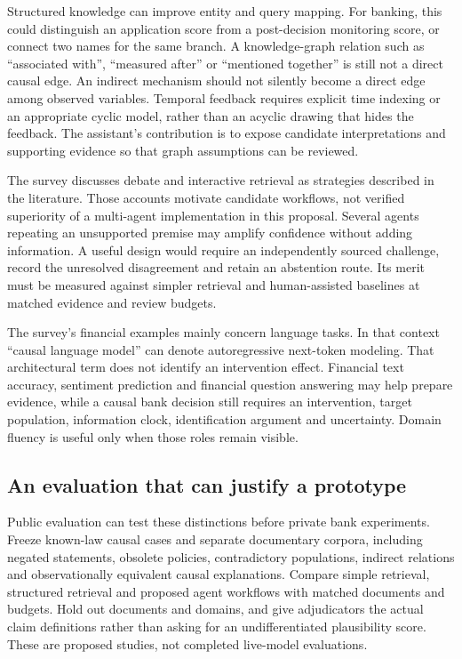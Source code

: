 Structured knowledge can improve entity and query mapping. For banking, this
could distinguish an application score from a post-decision monitoring score,
or connect two names for the same branch. A knowledge-graph relation such as
``associated with'', ``measured after'' or ``mentioned together'' is still not
a direct causal edge. An indirect mechanism should not silently become a
direct edge among observed variables. Temporal feedback requires explicit
time indexing or an appropriate cyclic model, rather than an acyclic drawing
that hides the feedback. The assistant's contribution is to expose candidate
interpretations and supporting evidence so that graph assumptions can be
reviewed.

The survey discusses debate and interactive retrieval as strategies described
in the literature. Those accounts motivate candidate workflows, not verified
superiority of a multi-agent implementation in this proposal. Several agents
repeating an unsupported premise may amplify confidence without adding
information. A useful design would require an independently sourced challenge,
record the unresolved disagreement and retain an abstention route. Its merit
must be measured against simpler retrieval and human-assisted baselines at
matched evidence and review budgets.

The survey's financial examples mainly concern language tasks. In that context
``causal language model'' can denote autoregressive next-token modeling.
That architectural term does not identify an intervention effect. Financial
text accuracy, sentiment prediction and financial question answering may help
prepare evidence, while a causal bank decision still requires an intervention,
target population, information clock, identification argument and uncertainty.
Domain fluency is useful only when those roles remain visible.

\subsection{An evaluation that can justify a prototype}

Public evaluation can test these distinctions before private bank experiments.
Freeze known-law causal cases and separate documentary corpora, including
negated statements, obsolete policies, contradictory populations, indirect
relations and observationally equivalent causal explanations. Compare simple
retrieval, structured retrieval and proposed agent workflows with matched
documents and budgets. Hold out documents and domains, and give adjudicators
the actual claim definitions rather than asking for an undifferentiated
plausibility score. These are proposed studies, not completed live-model
evaluations.

